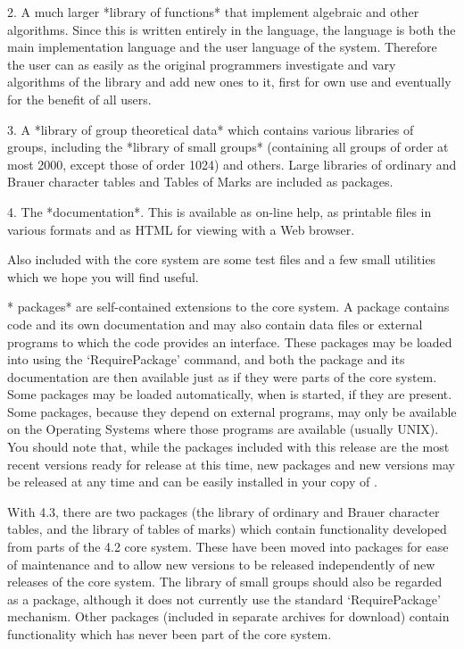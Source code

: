   \item{2.}  
	A much larger *library of {\GAP} functions* that
  implement algebraic and other algorithms.  Since this is written
  entirely in the {\GAP} language, the {\GAP} language is both the
  main implementation language and the user language of the system.
  Therefore the user can as easily as the original programmers
  investigate and vary algorithms of the library and add new ones to
  it, first for own use and eventually for the benefit of all {\GAP}
  users.

  \item{3.}  
	A *library of group theoretical data* which contains
  various libraries of groups, including the *library of small groups*
  (containing all groups of order at most 2000, except those of order
  1024) and others. Large libraries of ordinary and Brauer character
  tables and Tables of Marks are included as packages.

  \item{4.}
    The *documentation*.  This is available as on-line help, as
    printable files in various formats and as HTML for viewing
    with a Web browser.

\endlist

Also included with the core system are some test files and a few
small utilities which we hope you will find useful.


*{\GAP} packages* are self-contained extensions to the core system.  A
package contains {\GAP} code and its own documentation and may also
contain data files or external programs to which the {\GAP} code
provides an interface.  These packages may be loaded into {\GAP} using
the `RequirePackage' command, and both the package and its
documentation are then available just as if they were parts of the
core system. Some packages may be loaded automatically, when {\GAP} is
started, if they are present. Some packages, because they depend on
external programs, may only be available on the Operating Systems
where those programs are available (usually UNIX). You should note
that, while the packages included with this release are the most
recent versions ready for release at this time, new packages and new
versions may be released at any time and can be easily installed in
your copy of {\GAP}.

With {\GAP} 4.3, there are two packages (the library of ordinary and
Brauer character tables, and the library of tables of marks) which
contain functionality developed from parts of the {\GAP} 4.2 core
system. These have been moved into packages for ease of maintenance
and to allow new versions to be released independently of new releases
of the core system. The library of small groups should also be
regarded as a package, although it does not currently use the standard
`RequirePackage' mechanism.  Other packages (included in separate
archives for download) contain functionality which has never been part
of the core system.

